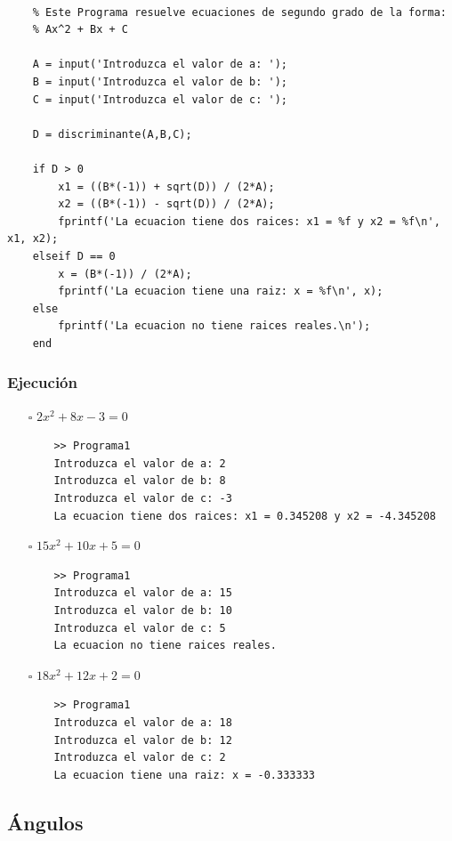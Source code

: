 \documentclass{article}
\begin{document}
	\begin{lstlisting}
	
	% Este Programa resuelve ecuaciones de segundo grado de la forma:
	% Ax^2 + Bx + C
	
	A = input('Introduzca el valor de a: ');
	B = input('Introduzca el valor de b: ');
	C = input('Introduzca el valor de c: ');
	
	D = discriminante(A,B,C);
	
	if D > 0
		x1 = ((B*(-1)) + sqrt(D)) / (2*A);
		x2 = ((B*(-1)) - sqrt(D)) / (2*A);
		fprintf('La ecuacion tiene dos raices: x1 = %f y x2 = %f\n', x1, x2);
	elseif D == 0
		x = (B*(-1)) / (2*A);
		fprintf('La ecuacion tiene una raiz: x = %f\n', x);
	else
		fprintf('La ecuacion no tiene raices reales.\n');
	end
	\end{lstlisting}
	
	\subsubsection{Ejecución}
	
	\begin{itemize}
	\item[$\square$] $2x^2+8x-3=0$		
	
	\begin{lstlisting}
	>> Programa1
	Introduzca el valor de a: 2
	Introduzca el valor de b: 8
	Introduzca el valor de c: -3
	La ecuacion tiene dos raices: x1 = 0.345208 y x2 = -4.345208
	\end{lstlisting}
	
	\item[$\square$] $15x^2+10x+5=0$
	
	\begin{lstlisting}
	>> Programa1
	Introduzca el valor de a: 15
	Introduzca el valor de b: 10
	Introduzca el valor de c: 5
	La ecuacion no tiene raices reales.
	\end{lstlisting}
	
	\item[$\square$] $18x^2+12x+2=0$
	
	\begin{lstlisting}
	>> Programa1
	Introduzca el valor de a: 18
	Introduzca el valor de b: 12
	Introduzca el valor de c: 2
	La ecuacion tiene una raiz: x = -0.333333
	\end{lstlisting}
	
	\end{itemize}
	
	\newpage
	
	\subsection{Ángulos}
	
\end{document}
